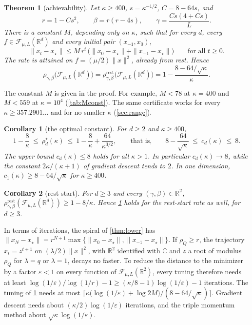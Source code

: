 \documentclass[11pt, a4paper]{article}
\newtheorem{theorem}{Theorem}
\newtheorem{corollary}{Corollary}
\theoremstyle{definition}
\newcommand{\R}{\mathbb{R}}
\newcommand{\F}{\mathcal{F}_{\mu,L}}
\newcommand{\eps}{\varepsilon}
\newcommand{\rest}{\mathrm{rest}}
\begin{document}
\begin{theorem}[achievability]
  \label{thm:upper}
  Let $\kappa\ge400$, $s=\kappa^{-1/2}$, $C=8-64s$, and
  \begin{equation}
    r=1-Cs^2,\qquad \beta=r(r-4s),\qquad \gamma=\frac{Cs(4+Cs)}{L}.
    \label{eq:tuning}
  \end{equation}
  There is a constant $M$, depending only on $\kappa$, such that for every $d$, every $f\in\F(\R^d)$ and every initial
  pair $(x_{-1},x_0)$,
  \[
    \|x_t-x_\star\|\le M\,r^t\,\bigl(\|x_0-x_\star\|+\|x_{-1}-x_\star\|\bigr)\qquad\text{for all }t\ge0.
  \]
  The rate is attained on $f=(\mu/2)\|x\|^2$, already from rest. Hence
  \[
    \rho_{\gamma,\beta}\bigl(\F(\R^d)\bigr)=\rho^\rest_{\gamma,\beta}\bigl(\F(\R^d)\bigr)=1-\frac{8-64/\sqrt\kappa}{\kappa}.
  \]
\end{theorem}

The constant $M$ is given in the proof. For example, $M<78$ at $\kappa=400$ and $M<559$ at $\kappa=10^4$
(\cref{tab:Mconst}). The same certificate works for every
$\kappa\ge357.2901\ldots$ and for no smaller $\kappa$ (\cref{sec:range}).

\begin{corollary}[the optimal constant]
  \label{cor:optimal}
  For $d\ge2$ and $\kappa\ge400$,
  \[
    1-\frac8\kappa\ \le\ \rho^\star_d(\kappa)\ \le\ 1-\frac8\kappa+\frac{64}{\kappa^{3/2}},
    \qquad\text{that is,}\qquad
    8-\frac{64}{\sqrt\kappa}\ \le\ c_d(\kappa)\ \le\ 8.
  \]
  The upper bound $c_d(\kappa)\le8$ holds for all $\kappa>1$. In particular $c_d(\kappa)\to8$, while the constant
  $2\kappa/(\kappa+1)$ of gradient descent tends to $2$. In one dimension, $c_1(\kappa)\ge8-64/\sqrt\kappa$ for
  $\kappa\ge400$.
\end{corollary}

\begin{corollary}[rest start]
  \label{cor:rest}
  For $d\ge3$ and every $(\gamma,\beta)\in\R^2$, $\rho^\rest_{\gamma,\beta}(\F(\R^d))\ge1-8/\kappa$. Hence
  \cref{cor:optimal} holds for the rest-start rate as well, for $d\ge3$.
\end{corollary}

In terms of iterations, the spiral of \cref{thm:lower} has
$\|x_N-x_\star\|=r^{N+1}\max\{\|x_0-x_\star\|,\|x_{-1}-x_\star\|\}$. If $\rho_Q\ge r$, the trajectory $x_t=z^{t+1}$ on
$(\lambda/2)\|x\|^2$, with $\R^2$ identified with $\mathbb C$ and $z$ a root of modulus $\rho_Q$ for $\lambda=q$ or
$\lambda=1$, decays no faster. To reduce the distance to the minimizer by a factor $\eps<1$ on every function of
$\F(\R^2)$, every tuning therefore needs at least $\log(1/\eps)/\log(1/r)-1\ge(\kappa/8-1)\log(1/\eps)-1$ iterations.
The tuning of \cref{thm:upper} needs at most $\bigl\lceil\kappa\bigl(\log(1/\eps)+\log 2M\bigr)/(8-64/\sqrt\kappa)\bigr\rceil$.
Gradient descent needs about $(\kappa/2)\log(1/\eps)$ iterations, and the triple momentum method about
$\sqrt\kappa\log(1/\eps)$.
\end{document}
